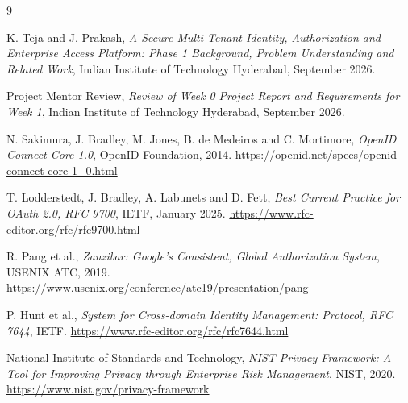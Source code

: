 \documentclass[11pt,a4paper]{article}
\begin{document}
\begin{thebibliography}{9}

K. Teja and J. Prakash,
\textit{A Secure Multi-Tenant Identity, Authorization and Enterprise Access Platform: Phase 1 Background, Problem Understanding and Related Work},
Indian Institute of Technology Hyderabad, September 2026.

Project Mentor Review,
\textit{Review of Week 0 Project Report and Requirements for Week 1},
Indian Institute of Technology Hyderabad, September 2026.

N. Sakimura, J. Bradley, M. Jones, B. de Medeiros and C. Mortimore,
\textit{OpenID Connect Core 1.0},
OpenID Foundation, 2014.
\url{https://openid.net/specs/openid-connect-core-1_0.html}

T. Lodderstedt, J. Bradley, A. Labunets and D. Fett,
\textit{Best Current Practice for OAuth 2.0, RFC 9700},
IETF, January 2025.
\url{https://www.rfc-editor.org/rfc/rfc9700.html}

R. Pang et al.,
\textit{Zanzibar: Google's Consistent, Global Authorization System},
USENIX ATC, 2019.
\url{https://www.usenix.org/conference/atc19/presentation/pang}

P. Hunt et al.,
\textit{System for Cross-domain Identity Management: Protocol, RFC 7644},
IETF.
\url{https://www.rfc-editor.org/rfc/rfc7644.html}

National Institute of Standards and Technology,
\textit{NIST Privacy Framework: A Tool for Improving Privacy through Enterprise Risk Management},
NIST, 2020.
\url{https://www.nist.gov/privacy-framework}

\end{thebibliography}
\end{document}
